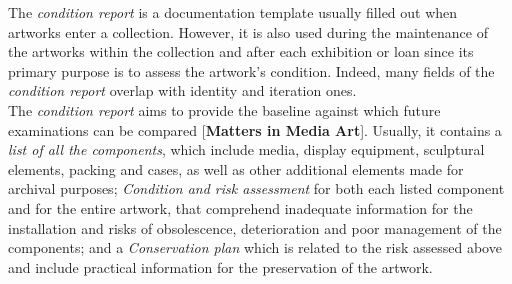 \newline
The \textit{condition report} is a documentation template usually filled out when artworks enter a collection. However, it is also used during the maintenance of the artworks within the collection and after each exhibition or loan since its primary purpose is to assess the artwork's condition. Indeed, many fields of the \textit{condition report} overlap with identity and iteration ones.\\
The \textit{condition report} aims to provide the baseline against which future examinations can be compared [\textbf{Matters in Media Art}]. Usually, it contains a \textit{list of all the components}, which include media, display equipment, sculptural elements, packing and cases, as well as other additional elements made for archival purposes; \textit{Condition and risk assessment} for both each listed component and for the entire artwork, that comprehend inadequate information for the installation and risks of obsolescence, deterioration and poor management of the components; and a \textit{Conservation plan} which is related to the risk assessed above and include practical information for the preservation of the artwork.


